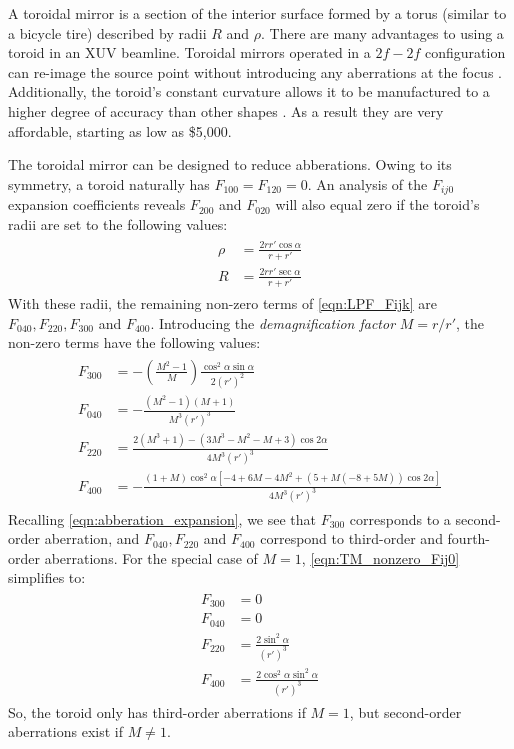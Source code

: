 A toroidal mirror is a section of the interior surface formed by a torus (similar to a bicycle tire) described by radii $R$ and $\rho$. There are many advantages to using a toroid in an XUV beamline. Toroidal mirrors operated in a $2f-2f$ configuration can re-image the source point without introducing any aberrations at the focus \cite{chirlaAttosecondPulseGeneration2011}. Additionally, the toroid's constant curvature allows it to be manufactured to a higher degree of accuracy than other shapes \cite{howellsMirrorsSynchrotronRadiationBeamlines1994}. As a result they are very affordable, starting as low as \$5,000.

The toroidal mirror can be designed to reduce abberations. Owing to its symmetry, a toroid naturally has ${F_{100} = F_{120} = 0}$. An analysis of the $F_{ij0}$ expansion coefficients reveals $F_{200}$ and $F_{020}$ will also equal zero if the toroid's radii are set to the following values:
\begin{gather}
\begin{aligned}
\rho &= \frac{2 r r' \cos \alpha}{r + r'} \\
R &= \frac{2 r r' \sec \alpha}{r+r'}
\end{aligned} 
\end{gather}
With these radii, the remaining non-zero terms of \cref{eqn:LPF_Fijk} are $F_{040}, F_{220}, F_{300}$ and $F_{400}$. Introducing the \textit{demagnification factor} $M = r / r'$, the non-zero terms have the following values:
\begin{gather}
\begin{aligned}
F_{300} &= - \left( \frac{M^2-1}{M} \right) \frac{\cos^2 \alpha \sin \alpha}{2 (r')^2} \\
F_{040} &= - \frac{(M^2-1)(M+1)}{M^3 (r')^3} \\
F_{220} &= \frac{2 (M^3+1) - (3M^3 - M^2 - M + 3) \cos 2 \alpha}{4 M^3 (r')^3} \\
F_{400} &= - \frac{(1+M) \cos^2 \alpha \left[-4 + 6M -4M^2 + (5+M(-8+5M)) \cos 2 \alpha\right]}{4 M^3 (r')^3}
\end{aligned}
\label{eqn:TM_nonzero_Fij0}
\end{gather}
Recalling \cref{eqn:abberation_expansion}, we see that $F_{300}$ corresponds to a second-order aberration, and $F_{040}, F_{220}$ and $F_{400}$ correspond to third-order and fourth-order aberrations. For the special case of $M=1$, \cref{eqn:TM_nonzero_Fij0} simplifies to:
\begin{gather}
\begin{aligned}
F_{300} &= 0 \\
F_{040} &= 0 \\
F_{220} &= \frac{2 \sin^2 \alpha}{(r')^3} \\
F_{400} &= \frac{2 \cos^2 \alpha \sin^2 \alpha}{(r')^3}
\end{aligned}
\end{gather}
So, the toroid only has third-order aberrations if $M=1$, but second-order aberrations exist if $M \ne 1$.

